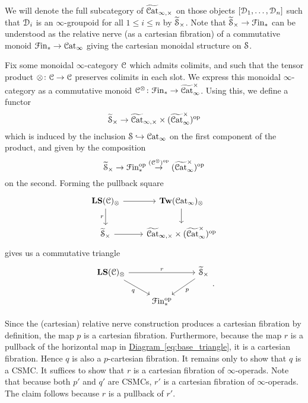 \documentclass[main.tex]{subfiles}
\begin{document}
\begin{construction}
  We will denote the full subcategory of $\TICatCart$ on those objects $[\category{D}_{1}, \ldots, \category{D}_{n}]$ such that $\category{D}_{i}$ is an $\infty$-groupoid for all $1 \leq i \leq n$ by $\TSCart$. Note that $\TSCart \to \Finp$ can be understood as the relative nerve (as a cartesian fibration) of a commutative monoid $\Finp \to \ICat$ giving the cartesian monoidal structure on $\S$.

  Fix some monoidal $\infty$-category $\category{C}$ which admits colimits, and such that the tensor product $\otimes\colon \category{C} \to \category{C}$ preserves colimits in each slot. We express this monoidal $\infty$-category as a commutative monoid $\category{C}^{\otimes}\colon \Finp \to \TICatCocart$. Using this, we define a functor
  \begin{equation*}
    \TSCart \to \TICatCart \times (\TICatCocart)\op
  \end{equation*}
  which is induced by the inclusion $\S \hookrightarrow \ICat$ on the first component of the product, and given by the composition
  \begin{equation*}
    \TSCart \to \Finp\op \overset{(\category{C}^{\otimes})\op}{\to} (\TICatCocart)\op
  \end{equation*}
  on the second. Forming the pullback square
  \begin{equation*}
    \begin{tikzcd}
      \LS(\category{C})_{\otimes}
      \arrow[r]
      \arrow[d, swap, "r"]
      & \Tw(\ICat)_{\otimes}
      \arrow[d]
      \\
      \TSCart
      \arrow[r]
      & \TICatCart \times (\TICatCocart)\op
    \end{tikzcd}
  \end{equation*}
  gives us a commutative triangle
  \begin{equation*}
    \begin{tikzcd}
      \LS(\category{C})_{\otimes}
      \arrow[rr, "r"]
      \arrow[dr, swap, "q"]
      && \TSCart
      \arrow[dl, "p"]
      \\
      & \Finp\op
    \end{tikzcd}.
  \end{equation*}

  Since the (cartesian) relative nerve construction produces a cartesian fibration by definition, the map $p$ is a cartesian fibration. Furthermore, because the map $r$ is a pullback of the horizontal map in \hyperref[eq:base_triangle]{Diagram~\ref*{eq:base_triangle}}, it is a cartesian fibration. Hence $q$ is also a $p$-cartesian fibration. It remains only to show that $q$ is a CSMC. It suffices to show that $r$ is a cartesian fibration of $\infty$-operads. Note that because both $p'$ and $q'$ are CSMCs, $r'$ is a cartesian fibration of $\infty$-operads. The claim follows because $r$ is a pullback of $r'$.
\end{construction}
\end{document}
